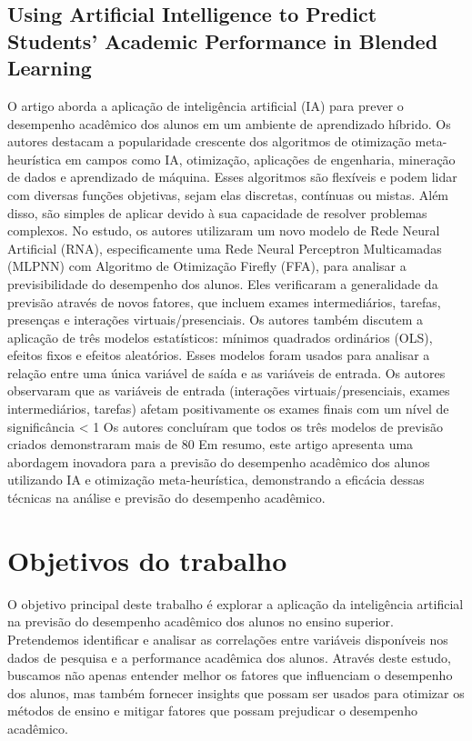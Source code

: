 \documentclass[conference]{IEEEtran}
\begin{document}
\subsection{Using Artificial Intelligence to Predict Students’ Academic
Performance in Blended Learning\cite{b10}}
O artigo aborda a aplicação de inteligência artificial (IA) para prever o desempenho acadêmico dos alunos em um ambiente de aprendizado híbrido.
Os autores destacam a popularidade crescente dos algoritmos de otimização meta-heurística em campos como IA, otimização, aplicações de engenharia, mineração de dados e aprendizado de máquina. Esses algoritmos são flexíveis e podem lidar com diversas funções objetivas, sejam elas discretas, contínuas ou mistas. Além disso, são simples de aplicar devido à sua capacidade de resolver problemas complexos.
No estudo, os autores utilizaram um novo modelo de Rede Neural Artificial (RNA), especificamente uma Rede Neural Perceptron Multicamadas (MLPNN) com Algoritmo de Otimização Firefly (FFA), para analisar a previsibilidade do desempenho dos alunos. Eles verificaram a generalidade da previsão através de novos fatores, que incluem exames intermediários, tarefas, presenças e interações virtuais/presenciais.
Os autores também discutem a aplicação de três modelos estatísticos: mínimos quadrados ordinários (OLS), efeitos fixos e efeitos aleatórios. Esses modelos foram usados para analisar a relação entre uma única variável de saída e as variáveis de entrada. Os autores observaram que as variáveis de entrada (interações virtuais/presenciais, exames intermediários, tarefas) afetam positivamente os exames finais com um nível de significância < 1%
Os autores concluíram que todos os três modelos de previsão criados demonstraram mais de 80%
Em resumo, este artigo apresenta uma abordagem inovadora para a previsão do desempenho acadêmico dos alunos utilizando IA e otimização meta-heurística, demonstrando a eficácia dessas técnicas na análise e previsão do desempenho acadêmico.

\section{Objetivos do trabalho}
O objetivo principal deste trabalho é explorar a aplicação da inteligência artificial na previsão do desempenho acadêmico dos alunos no ensino superior. Pretendemos identificar e analisar as correlações entre variáveis disponíveis nos dados de pesquisa e a performance acadêmica dos alunos. Através deste estudo, buscamos não apenas entender melhor os fatores que influenciam o desempenho dos alunos, mas também fornecer insights que possam ser usados para otimizar os métodos de ensino e mitigar fatores que possam prejudicar o desempenho acadêmico.
\end{document}
